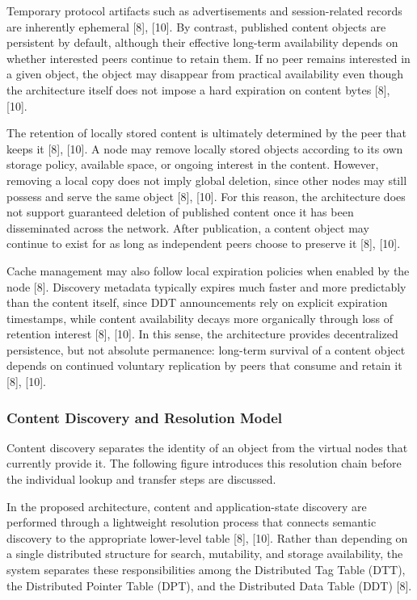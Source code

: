 \documentclass[12pt,a4paper]{article}
\begin{document}
Temporary protocol artifacts such as advertisements and session-related records are inherently ephemeral [8], [10]. By contrast, published content objects are persistent by default, although their effective long-term availability depends on whether interested peers continue to retain them. If no peer remains interested in a given object, the object may disappear from practical availability even though the architecture itself does not impose a hard expiration on content bytes [8], [10].

The retention of locally stored content is ultimately determined by the peer that keeps it [8], [10]. A node may remove locally stored objects according to its own storage policy, available space, or ongoing interest in the content. However, removing a local copy does not imply global deletion, since other nodes may still possess and serve the same object [8], [10]. For this reason, the architecture does not support guaranteed deletion of published content once it has been disseminated across the network. After publication, a content object may continue to exist for as long as independent peers choose to preserve it [8], [10].

Cache management may also follow local expiration policies when enabled by the node [8]. Discovery metadata typically expires much faster and more predictably than the content itself, since DDT announcements rely on explicit expiration timestamps, while content availability decays more organically through loss of retention interest [8], [10]. In this sense, the architecture provides decentralized persistence, but not absolute permanence: long-term survival of a content object depends on continued voluntary replication by peers that consume and retain it [8], [10].

\subsubsection{Content Discovery and Resolution Model}

Content discovery separates the identity of an object from the virtual nodes that currently provide it. The following figure introduces this resolution chain before the individual lookup and transfer steps are discussed.

\thesisdtttikz

In the proposed architecture, content and application-state discovery are performed through a lightweight resolution process that connects semantic discovery to the appropriate lower-level table [8], [10]. Rather than depending on a single distributed structure for search, mutability, and storage availability, the system separates these responsibilities among the Distributed Tag Table (DTT), the Distributed Pointer Table (DPT), and the Distributed Data Table (DDT) [8].
\end{document}
